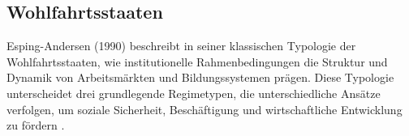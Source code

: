 

\subsection{Wohlfahrtsstaaten} 

Esping-Andersen (1990) beschreibt in seiner klassischen Typologie der Wohlfahrtsstaaten, 
wie institutionelle Rahmenbedingungen die Struktur und Dynamik von Arbeitsmärkten und 
Bildungssystemen prägen. Diese Typologie unterscheidet drei grundlegende Regimetypen, die 
unterschiedliche Ansätze verfolgen, um soziale Sicherheit, Beschäftigung und 
wirtschaftliche Entwicklung zu fördern \parencite[vgl.][S. 27–28]{espingandersen1990thethree}.

